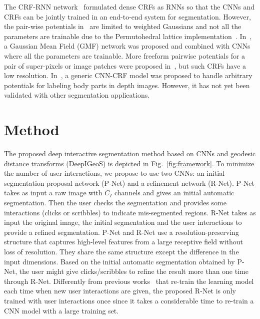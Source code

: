 \documentclass[10pt,journal,compsoc]{IEEEtran}
\begin{document}
The CRF-RNN network~\cite{Zheng2015a} formulated dense CRFs as RNNs so that the CNNs and CRFs can be jointly trained in an end-to-end system for segmentation. However, the pair-wise potentials in~\cite{Zheng2015a} are limited to weighted Gaussians and not all the parameters are trainable due to the Permutohedral lattice implementation~\cite{Adams2010}. In~\cite{Vemulapalli2016}, a Gaussian Mean Field (GMF) network was proposed and combined with CNNs where all the parameters are trainable. More freeform pairwise potentials for a pair of super-pixels or image patches were proposed in~\cite{Liu2014,Lin2016cvpr_efficient}, but such CRFs have a low resolution. In~\cite{Kirillov2016}, a generic CNN-CRF model was proposed to handle arbitrary potentials for labeling body parts in depth images. However, it has not yet been validated with other segmentation applications.

\section{Method}

The proposed deep interactive segmentation method based on CNNs and geodesic distance transforms (DeepIGeoS) is depicted in Fig.~\ref{fig:framework}. To minimize the number of user interactions, we propose to use two CNNs: an initial segmentation proposal network (P-Net) and a refinement network (R-Net). P-Net takes as input a raw image with $C_I$ channels and gives an initial automatic segmentation. Then the user checks the segmentation and provides some interactions (clicks or scribbles) to indicate mis-segmented regions. R-Net takes as input the original image, the initial segmentation and the user interactions to provide a refined segmentation. %
P-Net and R-Net use a resolution-preserving structure that captures high-level features from a large receptive field without loss of resolution. They share the same structure except the difference in the input dimensions. Based on the initial automatic segmentation obtained by P-Net, the user might give clicks/scribbles to refine the result more than one time through R-Net. Differently from previous works~\cite{Wang2016a} that re-train the learning model each time when new user interactions are given, the proposed R-Net is only trained with user interactions once since it takes a considerable time to re-train a CNN model with a large training set.
\end{document}
